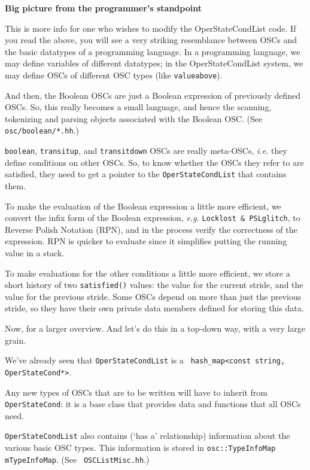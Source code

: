 \documentclass[11pt]{article}
\begin{document}
\begin{center}
  \textbf{Big picture from the programmer's standpoint}
\end{center}

This is more info for one who wishes to modify the OperStateCondList
code.  If you read the above, you will see a very striking resemblance
between OSCs and the basic datatypes of a programming language.  In
a programming language, we may define variables of different
datatypes; in the OperStateCondList system, we may define OSCs of
different OSC types (like \texttt{valueabove}).

And then, the Boolean OSCs are just a Boolean expression of previously
defined OSCs.  So, this really becomes a small language, and hence the
scanning, tokenizing and parsing objects associated with the Boolean
OSC.  (See \texttt{osc/boolean/*.hh}.)

\texttt{boolean}, \texttt{transitup}, and \texttt{transitdown} OSCs are really
meta-OSCs, \textit{i.e.} they define conditions on other OSCs.  So, to
know whether the OSCs they refer to are satisfied, they need to get a
pointer to the \texttt{OperStateCondList} that contains them.

To make the evaluation of the Boolean expression a little more
efficient, we convert the infix form of the Boolean expression, \textit{
e.g.} \texttt{Locklost \&\ PSLglitch}, to Reverse Polish Notation
(RPN), and in the process verify the correctness of the expression.
RPN is quicker to evaluate since it simplifies putting the running
value in a stack.

To make evaluations for the other conditions a little more efficient,
we store a short history of two \texttt{satisfied()} values: the value
for the current stride, and the value for the previous stride.  Some
OSCs depend on more than just the previous stride, so they have their
own private data members defined for storing this data. 

Now, for a larger overview.  And let's do this in a top-down way, with
a very large grain.

We've already seen that \texttt{OperStateCondList} is a \texttt{
hash\_map<const string, OperStateCond*>}.

Any new types of OSCs that are to be written will have to inherit from
\texttt{OperStateCond}: it is a base class that provides data and
functions that all OSCs need.

\texttt{OperStateCondList} also contains (`has a' relationship)
information about the various basic OSC types.  This information is
stored in \texttt{osc::TypeInfoMap mTypeInfoMap}.  (See \texttt{
OSCListMisc.hh}.)
\end{document}
